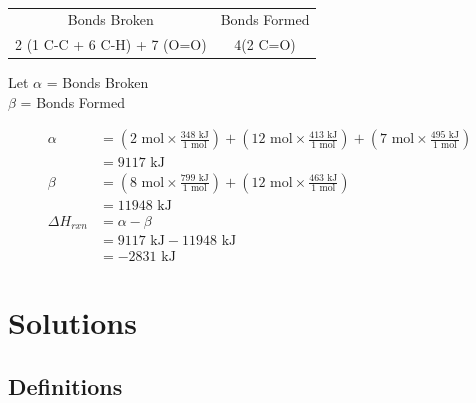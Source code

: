 \documentclass[11pt]{article}
\begin{document}
    \begin{center}
         \\
        \break
        \begin{tabular}{ c | c }
            Bonds Broken & Bonds Formed \\
            2 (1 C-C + 6 C-H) + 7 (O=O)& 4(2 C=O) \\
        \end{tabular}
    \end{center}

    \begin{center}
        Let $\alpha$ = Bonds Broken \\
            $\beta$ = Bonds Formed \\
    \end{center}

    \begin{equation*}
        \begin{aligned}
            \alpha          &= \left(2 \text{ mol} \times \frac{348 \text{ kJ}}{1 \text{ mol}} \right) + \left(12 \text{ mol} \times \frac{413 \text{ kJ}}{1 \text{ mol}}\right) + \left(7 \text{ mol} \times \frac{495 \text{ kJ}}{1 \text{ mol}}\right) \\
                            &= 9117 \text{ kJ} \\
            \beta           &= \left(8 \text{ mol} \times \frac{799 \text{ kJ}}{1 \text{ mol}}\right) + \left(12 \text{ mol} \times \frac{463 \text{ kJ}}{1 \text{ mol}}\right) \\
                            &= 11 948 \text{ kJ} \\
            \Delta H_{rxn}  &= \alpha - \beta \\
                            &= 9117 \text{ kJ} - 11948 \text{ kJ} \\
                            &= -2831 \text{ kJ}
        \end{aligned}
    \end{equation*}

    \section{Solutions}

    \subsection{Definitions}
\end{document}
